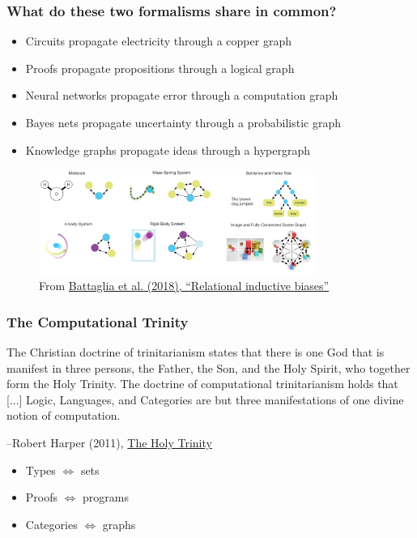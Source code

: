 \documentclass{beamer}
\begin{document}
\begin{frame}
  \frametitle{What do these two formalisms share in common?}
  \begin{itemize}
    \item Circuits propagate electricity through a copper graph
    \item Proofs propagate propositions through a logical graph
    \item Neural networks propagate error through a computation graph
    \item Bayes nets propagate uncertainty through a probabilistic graph
    \item Knowledge graphs propagate ideas through a hypergraph
  \end{itemize}
  \begin{figure}[H]
    \centering
    \includegraphics[width=0.8\textwidth]{../clipart/relational_biases.png}
    \caption{From \href{https://arxiv.org/pdf/1806.01261.pdf}{Battaglia et al. (2018), ``Relational inductive biases''}}
  \end{figure}
\end{frame}


\begin{frame}
    \frametitle{The Computational Trinity}
    \setlength{\epigraphwidth}{0.72\textwidth}
    \epigraph{The Christian doctrine of trinitarianism states that there is one God that is manifest in three persons, the Father, the Son, and the Holy Spirit, who together form the Holy Trinity. The doctrine of computational trinitarianism holds that [...] Logic, Languages, and Categories are but three manifestations of one divine notion of computation.}{--Robert Harper (2011), \href{https://existentialtype.wordpress.com/2011/03/27/the-holy-trinity/}{The Holy Trinity}}
    \begin{itemize}
        \item Types $\Leftrightarrow$ sets
        \item Proofs $\Leftrightarrow$ programs
        \item Categories $\Leftrightarrow$ graphs
    \end{itemize}
\end{frame}
\end{document}
